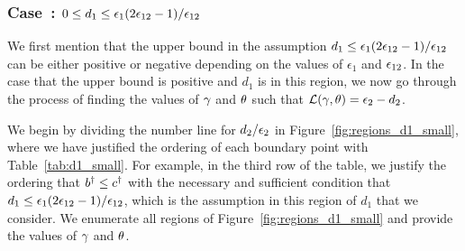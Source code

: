 \subsubsection{Case~: $0 \leq d_1 \leq \epsilon_1 (2\epsilon_{12} - 1)/\epsilon_{12}$}



We first mention that the upper bound in the assumption $d_1 \leq \epsilon_1 (2\epsilon_{12} - 1)/\epsilon_{12}$ can be either positive or negative depending on the values of $\epsilon_1$ and $\epsilon_{12}$.  In the case that the upper bound is positive and $d_1$ is in this region, we now go through the process of finding the values of $\gamma$ and $\theta$ such that $\mathcal{L}(\gamma, \theta) = \epsilon_2 - d_2$.  


We begin by dividing the number line for $d_2/\epsilon_2$ in Figure~\ref{fig:regions_d1_small}, where we have justified the ordering of each boundary point with Table~\ref{tab:d1_small}.  For example, in the third row of the table, we justify the ordering that $b^{\dagger} \leq c^{\dagger}$ with the necessary and sufficient condition that $d_1 \leq \epsilon_1 (2\epsilon_{12} - 1)/\epsilon_{12}$, which is the assumption in this region of $d_1$ that we consider.  We enumerate all regions of Figure~\ref{fig:regions_d1_small} and provide the values of $\gamma$ and $\theta$.


